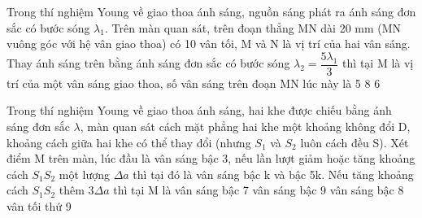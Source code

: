 \begin{vidu}%
Trong thí nghiệm Young về giao thoa ánh sáng, nguồn sáng phát ra ánh sáng đơn sắc có bước sóng ${{\lambda}_{1}} $. Trên màn quan sát, trên đoạn thẳng MN dài 20 mm (MN vuông góc với hệ vân giao thoa) có 10 vân tối, M và N là vị trí của hai vân sáng. Thay ánh sáng trên bằng ánh sáng đơn sắc có bước sóng ${{\lambda}_{2}}=\dfrac{5{{\lambda}_{1}}}{3} $ thì tại M là vị trí của một vân sáng giao thoa, số vân sáng trên đoạn MN lúc này là
\choice
{}
{5}
{8}
{6}
\end{vidu} %
\begin{vidu}%
Trong thí nghiệm Young về giao thoa ánh sáng, hai khe được chiếu bằng ánh sáng đơn sắc $\lambda $, màn quan sát cách mặt phẳng hai khe một khoảng không đổi D, khoảng cách giữa hai khe có thể thay đổi (nhưng ${S_1} $ và ${S_2} $ luôn cách đều S). Xét điểm M trên màn, lúc đầu là vân sáng bậc 3, nếu lần lượt giảm hoặc tăng khoảng cách ${S_1}{S_2} $ một lượng $\Delta a $ thì tại đó là vân sáng bậc k và bậc 5k. Nếu tăng khoảng cách ${S_1}{S_2} $ thêm $3\Delta a $ thì tại M là
\choice
{vân sáng bậc 7}
{\True vân sáng bậc 9}
{vân sáng bậc 8}
{vân tối thứ 9}
\end{vidu} %

